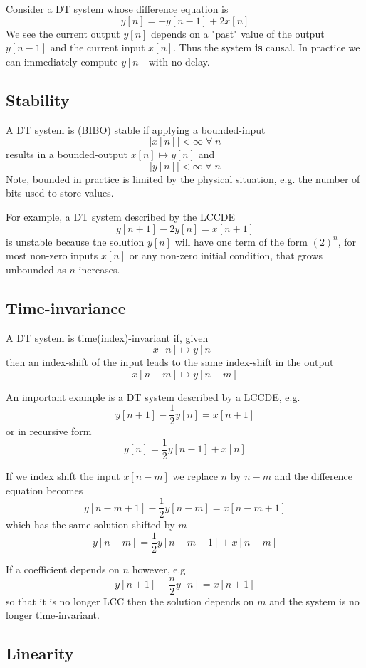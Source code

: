 \begin{example}
Consider a DT system whose difference equation is
\[
y[n] = -y[n-1] + 2x[n]
\]
We see the current output $y[n]$ depends on a "past" value of the output $y[n-1]$ and the current input $x[n]$. Thus the system \textbf{is} causal. In practice we can immediately compute $y[n]$ with no delay. 
\end{example}

\subsection{Stability}

A DT system is (BIBO) stable if applying a bounded-input
\[
\left|x[n]\right| < \infty \; \forall \; n
\]
results in a bounded-output $x[n] \mapsto y[n]$ and 
\[
\left|y[n]\right| < \infty \; \forall \; n
\]
Note, bounded in practice is limited by the physical situation, e.g. the number of bits used to store values.

For example, a DT system described by the LCCDE
\[
y[n+1] - 2 y[n] = x[n+1]
\]
is unstable because the solution $y[n]$ will have one term of the form $\left( 2\right)^n$, for most non-zero inputs $x[n]$ or any non-zero initial condition, that grows unbounded as $n$ increases.

\subsection{Time-invariance}
A DT system is time(index)-invariant if, given
\[
x[n] \mapsto y[n]
\]
then an index-shift of the input leads to the same index-shift in the output
\[
x[n-m] \mapsto y[n-m]
\]

An important example is a DT system described by a LCCDE, e.g.
\[
y[n+1] - \frac{1}{2} y[n] = x[n+1]
\]
or in recursive form
\[
y[n] = \frac{1}{2} y[n-1] + x[n]
\]

If we index shift the input $x[n - m]$ we replace $n$ by $n-m$ and the difference equation becomes
\[
y[n-m+1] - \frac{1}{2} y[n-m] = x[n-m+1]
\]
which has the same solution shifted by $m$
\[
y[n-m] = \frac{1}{2} y[n-m -1] + x[n-m]
\]

If a coefficient depends on $n$ however, e.g
\[
y[n+1] - \frac{n}{2} y[n] = x[n+1]
\]
so that it is no longer LCC then the solution depends on $m$ and the system is no longer time-invariant.

\subsection{Linearity}

